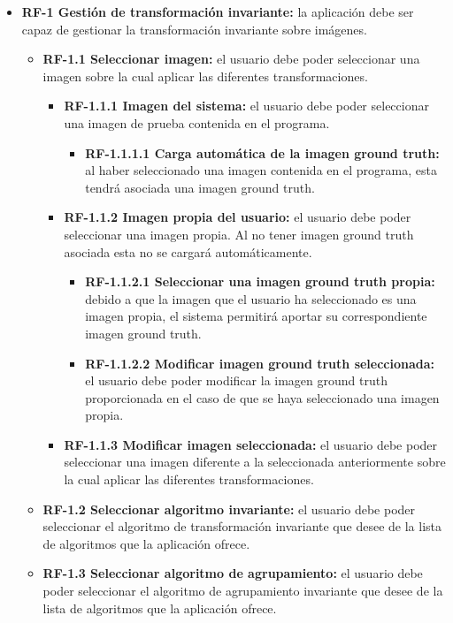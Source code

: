 \begin{itemize}
    \item \textbf{RF-1 Gestión de transformación invariante:} la aplicación debe ser capaz de gestionar la transformación invariante sobre imágenes.
    \begin{itemize}
        \item \textbf{RF-1.1 Seleccionar imagen:} el usuario debe poder seleccionar una imagen sobre la cual aplicar las diferentes transformaciones.
        \begin{itemize}
            \item \textbf{RF-1.1.1 Imagen del sistema:} el usuario debe poder seleccionar una imagen de prueba contenida en el programa.
            \begin{itemize}
                \item \textbf{RF-1.1.1.1 Carga automática de la imagen ground truth:} al haber seleccionado una imagen contenida en el programa, esta tendrá asociada una imagen ground truth.
            \end{itemize}
            \item \textbf{RF-1.1.2 Imagen propia del usuario:} el usuario debe poder seleccionar una imagen propia. Al no tener imagen ground truth asociada esta no se cargará automáticamente.
            \begin{itemize}
                \item \textbf{RF-1.1.2.1 Seleccionar una imagen ground truth propia:} debido a que la imagen que el usuario ha seleccionado es una imagen propia, el sistema permitirá aportar su correspondiente imagen ground truth.
                \item \textbf{RF-1.1.2.2 Modificar imagen ground truth seleccionada:} el usuario debe poder modificar la imagen ground truth proporcionada en el caso de que se haya seleccionado una imagen propia.
            \end{itemize}
            \item \textbf{RF-1.1.3 Modificar imagen seleccionada:} el usuario debe poder seleccionar una imagen diferente a la seleccionada anteriormente sobre la cual aplicar las diferentes transformaciones.
        \end{itemize}
        \item \textbf{RF-1.2 Seleccionar algoritmo invariante:} el usuario debe poder seleccionar el algoritmo de transformación invariante que desee de la lista de algoritmos que la aplicación ofrece.
        \item \textbf{RF-1.3 Seleccionar algoritmo de agrupamiento:} el usuario debe poder seleccionar el algoritmo de agrupamiento invariante que desee de la lista de algoritmos que la aplicación ofrece.

\end{itemize}
\end{itemize}
